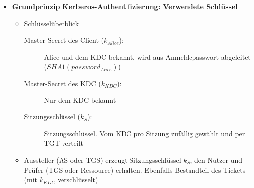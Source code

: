 \begin{itemize}
\begin{enumerate}
	\end{enumerate}
	\item \textbf{Grundprinzip Kerberos-Authentifizierung: Verwendete Schlüssel}
	\begin{itemize}
		\item Schlüsselüberblick
		\begin{description}
			\item[Master-Secret des Client (\(k_{Alice}\)):] Alice und dem KDC bekannt, wird aus Anmeldepasswort abgeleitet (\(SHA1(password_{Alice})\))
			\item[Master-Secret des KDC (\(k_{KDC}\)):] Nur dem KDC bekannt
			\item[Sitzungsschlüssel (\(k_S\)):] Sitzungsschlüssel. Vom KDC pro Sitzung zufällig gewählt und per TGT verteilt
		\end{description}
		\item Aussteller (AS oder TGS) erzeugt Sitzungsschlüssel \(k_S\), den Nutzer und Prüfer (TGS oder Ressource) erhalten. Ebenfalls Bestandteil des Tickets (mit \(k_{KDC}\) verschlüsselt)
	\end{itemize}
\end{itemize}


